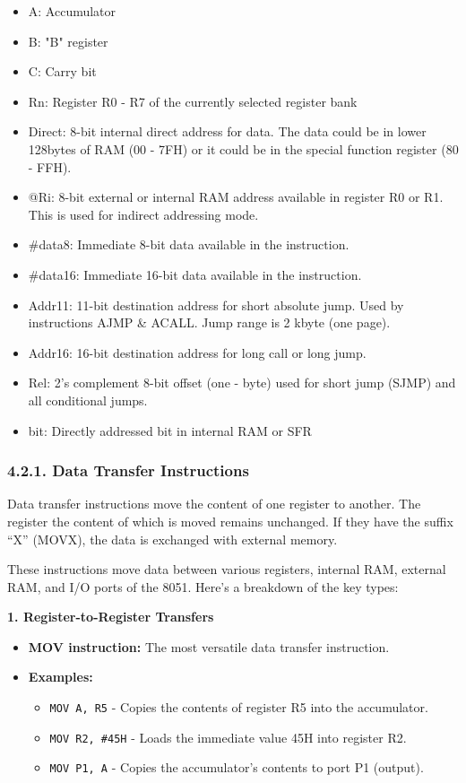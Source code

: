 \documentclass[
]{article}
\begin{document}
\begin{itemize}
\item
  A: Accumulator
\item
  B: "B" register
\item
  C: Carry bit
\item
  Rn: Register R0 - R7 of the currently selected register bank
\item
  Direct: 8-bit internal direct address for data. The data could be in
  lower 128bytes of RAM (00 - 7FH) or it could be in the special
  function register (80 - FFH).
\item
  @Ri: 8-bit external or internal RAM address available in register R0
  or R1. This is used for indirect addressing mode.
\item
  \#data8: Immediate 8-bit data available in the instruction.
\item
  \#data16: Immediate 16-bit data available in the instruction.
\item
  Addr11: 11-bit destination address for short absolute jump. Used by
  instructions AJMP \& ACALL. Jump range is 2 kbyte (one page).
\item
  Addr16: 16-bit destination address for long call or long jump.
\item
  Rel: 2's complement 8-bit offset (one - byte) used for short jump
  (SJMP) and all conditional jumps.
\item
  bit: Directly addressed bit in internal RAM or SFR
\end{itemize}

\hypertarget{421-data-transfer-instructions}{%
\subsubsection{4.2.1. Data Transfer
Instructions}\label{421-data-transfer-instructions}}

Data transfer instructions move the content of one register to another.
The register the content of which is moved remains unchanged. If they
have the suffix ``X'' (MOVX), the data is exchanged with external
memory.

These instructions move data between various registers, internal RAM,
external RAM, and I/O ports of the 8051. Here's a breakdown of the key
types:

\textbf{1. Register-to-Register Transfers}

\begin{itemize}
\item
  \textbf{MOV instruction:} The most versatile data transfer
  instruction.
\item
  \textbf{Examples:}

  \begin{itemize}
  \item
    \texttt{MOV\ A,\ R5} - Copies the contents of register R5 into the
    accumulator.
  \item
    \texttt{MOV\ R2,\ \#45H} - Loads the immediate value 45H into
    register R2.
  \item
    \texttt{MOV\ P1,\ A} - Copies the accumulator's contents to port P1
    (output).
  \end{itemize}
\end{itemize}
\end{document}
